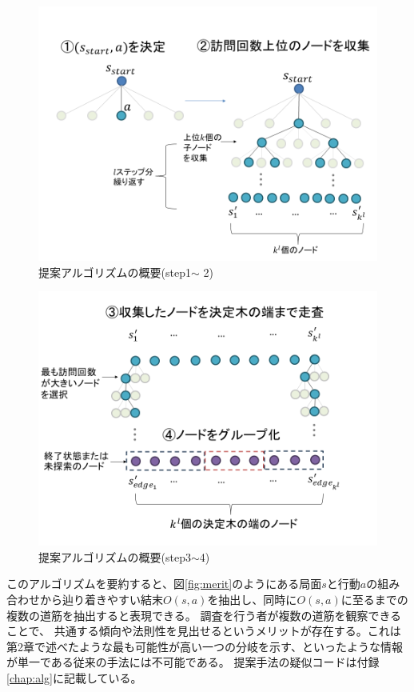 \begin{figure}[t]
    \centering
    \includegraphics[width=\linewidth]{./figure/1-2.png}
    \caption{提案アルゴリズムの概要(step1$\sim$ 2)}
    \label{fig:step1-2}
\end{figure}
\begin{figure}[t]
    \centering
    \includegraphics[width=\linewidth]{./figure/3-4.png}
    \caption{提案アルゴリズムの概要(step3$\sim $4)}
    \label{fig:step3-4}
\end{figure}

このアルゴリズムを要約すると、図\ref{fig:merit}のようにある局面$s$と行動$a$の組み合わせから辿り着きやすい結末$O(s, a)$を抽出し、同時に$O(s, a)$に至るまでの複数の道筋を抽出すると表現できる。
調査を行う者が複数の道筋を観察できることで、
共通する傾向や法則性を見出せるというメリットが存在する。これは第2章で述べたような最も可能性が高い一つの分岐を示す、といったような情報が単一である従来の手法には不可能である。
提案手法の疑似コードは付録\ref{chap:alg}に記載している。

